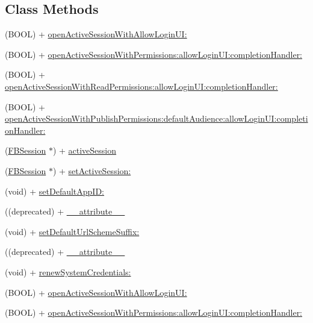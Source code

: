 \subsection*{Class Methods}
\begin{DoxyCompactItemize}
\item 
(B\+O\+OL) + \hyperlink{interfaceFBSession_abe6b20f6e3202521b7ecb4115c8e865d}{open\+Active\+Session\+With\+Allow\+Login\+U\+I\+:}
\item 
(B\+O\+OL) + \hyperlink{interfaceFBSession_ac90957d41f538f96b5d8c9087ad3ad2d}{open\+Active\+Session\+With\+Permissions\+:allow\+Login\+U\+I\+:completion\+Handler\+:}
\item 
(B\+O\+OL) + \hyperlink{interfaceFBSession_add12d4669d7e770d8fedeab148ca5dd9}{open\+Active\+Session\+With\+Read\+Permissions\+:allow\+Login\+U\+I\+:completion\+Handler\+:}
\item 
(B\+O\+OL) + \hyperlink{interfaceFBSession_a727a1541ad09287fb613a018e100534d}{open\+Active\+Session\+With\+Publish\+Permissions\+:default\+Audience\+:allow\+Login\+U\+I\+:completion\+Handler\+:}
\item 
(\hyperlink{interfaceFBSession}{F\+B\+Session} $\ast$) + \hyperlink{interfaceFBSession_aaf6863ab39e2f67733792453874d3870}{active\+Session}
\item 
(\hyperlink{interfaceFBSession}{F\+B\+Session} $\ast$) + \hyperlink{interfaceFBSession_af1b30bea1e3251f8d75f76b10369756e}{set\+Active\+Session\+:}
\item 
(void) + \hyperlink{interfaceFBSession_afb4f41ffcd4d824a16147cb41b932a32}{set\+Default\+App\+I\+D\+:}
\item 
((deprecated) + \hyperlink{interfaceFBSession_aab7b90337909b905920a4067b5253c2b}{\+\_\+\+\_\+attribute\+\_\+\+\_\+}
\item 
(void) + \hyperlink{interfaceFBSession_ac3d4f0df3cae8fe5091b9d98b9f166d4}{set\+Default\+Url\+Scheme\+Suffix\+:}
\item 
((deprecated) + \hyperlink{interfaceFBSession_aab7b90337909b905920a4067b5253c2b}{\+\_\+\+\_\+attribute\+\_\+\+\_\+}
\item 
(void) + \hyperlink{interfaceFBSession_a3b4d7c16af36ea5690d19bf77065dfaf}{renew\+System\+Credentials\+:}
\item 
(B\+O\+OL) + \hyperlink{interfaceFBSession_abe6b20f6e3202521b7ecb4115c8e865d}{open\+Active\+Session\+With\+Allow\+Login\+U\+I\+:}
\item 
(B\+O\+OL) + \hyperlink{interfaceFBSession_ac90957d41f538f96b5d8c9087ad3ad2d}{open\+Active\+Session\+With\+Permissions\+:allow\+Login\+U\+I\+:completion\+Handler\+:}

\end{DoxyCompactItemize}
